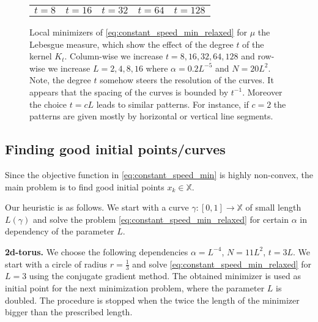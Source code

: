 \documentclass[draft,
a4paper,11pt,DIV=11,%
abstract=on%
]{scrartcl}
\begin{document}
\begin{figure}
  \begin{tabular}{ccccc}
$t=8$  &  $t=16$   & $t=32$  & $t=64$  & $t=128$ \\
  \end{tabular}
  \caption{Local minimizers  of \eqref{eq:constant_speed_min_relaxed} for $\mu$ the Lebesgue measure, which show the effect of the degree $t$ of the kernel $K_{t}$. Column-wise we increase $t=8,16,32,64,128$ and row-wise we increase $L=2,4,8,16$ where $\alpha = 0.2 L^{-5}$ and $N=20 L^{2}$. Note, the degree $t$ somehow steers the resolution of the curves. It appears that the spacing of the curves is bounded by $t^{-1}$.  Moreover the choice $t = c L$ leads to similar patterns. For instance, if $c=2$ the patterns are given mostly by horizontal or vertical line segments.}
  \label{fig:t_experiment}
\end{figure}




\subsection{Finding good initial points/curves}

Since the objective function in \eqref{eq:constant_speed_min} is highly non-convex, the main problem is to find good initial points $x_{k} \in \mathbb X$.

Our heuristic is as follows. We start with a curve $\gamma:[0,1]\to \mathbb X$ of small length $L(\gamma)$ and solve the problem \eqref{eq:constant_speed_min_relaxed} for certain $\alpha$ in dependency of the parameter $L$.

\textbf{2d-torus.}
We choose the following dependencies $\alpha = L^{-4}$, $N =11 L^{2}$, $t=3 L$. We start with a circle of radius $r=\frac13$ and solve \eqref{eq:constant_speed_min_relaxed} for $L=3$ using the conjugate gradient method. The obtained minimizer is used as initial point for the next minimization problem, where the parameter $L$ is doubled. The procedure is stopped when the twice the length of the minimizer bigger than the prescribed length.

%
%
\end{document}
